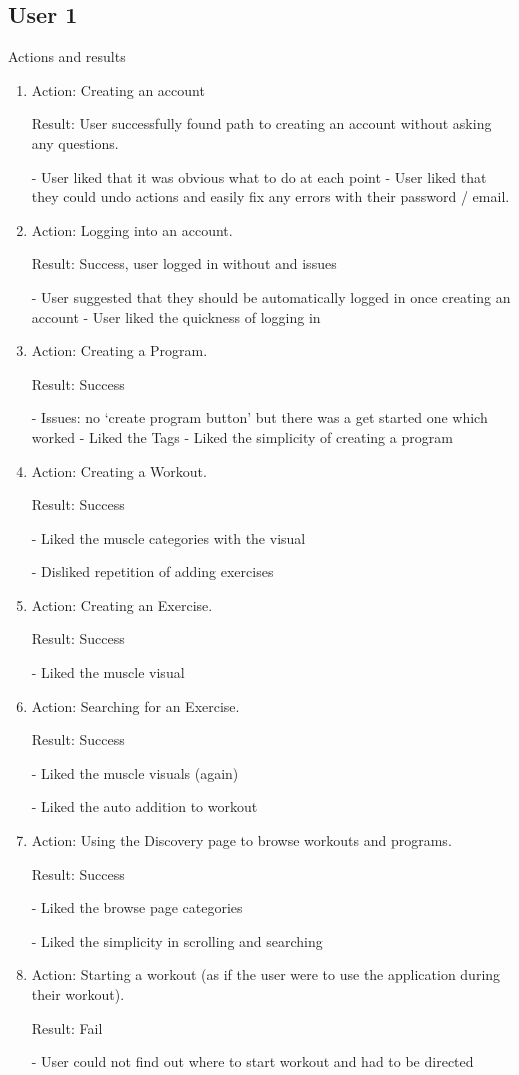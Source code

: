 \documentclass[12pt, titlepage]{article}
\begin{document}
\subsection{User 1}
Actions and results
\begin{enumerate}
\item Action: Creating an account

Result: User successfully found path to creating an account without asking any questions.

-	User liked that it was obvious what to do at each point
-	User liked that they could undo actions and easily fix any errors with their password / email.

\item Action: Logging into an account.

Result: Success, user logged in without and issues

-	User suggested that they should be automatically logged in once creating an account
-	User liked the quickness of logging in

\item Action: Creating a Program.

Result: Success 

-	Issues: no ‘create program button’ but there was a get started one which worked
-	Liked the Tags
-	Liked the simplicity of creating a program

\item Action: Creating a Workout.

Result: Success

-	Liked the muscle categories with the visual

-	Disliked repetition of adding exercises

\item Action: Creating an Exercise.

Result: Success

-	Liked the muscle visual

\item Action: Searching for an Exercise.

Result: Success

-	Liked the muscle visuals (again)

-	Liked the auto addition to workout

\item Action: Using the Discovery page to browse workouts and programs.

Result: Success

-	Liked the browse page categories

-	Liked the simplicity in scrolling and searching


\item Action: Starting a workout (as if the user were to use the application during their workout).

Result: Fail

-	User could not find out where to start workout and had to be directed
\end{enumerate}
\end{document}
